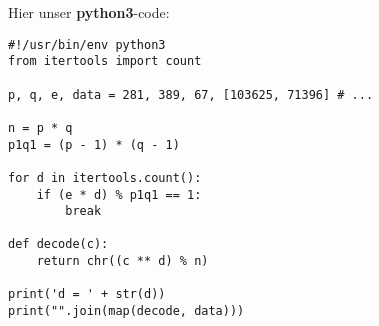\documentclass[a4paper,11pt]{article}
\begin{document}
\begin{enumerate}
    Hier unser \textbf{python3}-code:\begin{verbatim}
#!/usr/bin/env python3
from itertools import count

p, q, e, data = 281, 389, 67, [103625, 71396] # ...

n = p * q
p1q1 = (p - 1) * (q - 1)

for d in itertools.count():
    if (e * d) % p1q1 == 1:
        break

def decode(c):
    return chr((c ** d) % n)

print('d = ' + str(d))
print("".join(map(decode, data)))
\end{verbatim}

\end{enumerate}
\end{document}
